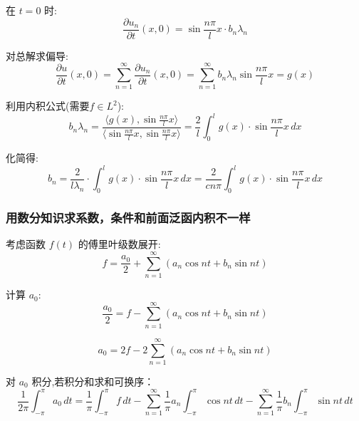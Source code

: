 \documentclass[12pt,a4paper]{article}
\numberwithin{subsection}{section}   %
\numberwithin{subsubsection}{subsection}
\theoremstyle{plain}
\theoremstyle{definition}
\theoremstyle{remark}
\theoremstyle{remark}
\begin{document}
	在 \(t = 0\) 时:
	\begin{equation}
		\frac{\partial u_n}{\partial t}(x, 0) = \sin \frac{n\pi}{l} x \cdot b_n \lambda_n
	\end{equation}
	
	对总解求偏导:
	\begin{equation}
		\frac{\partial u}{\partial t}(x, 0) = \sum_{n=1}^{\infty} \frac{\partial u_n}{\partial t}(x, 0) = \sum_{n=1}^{\infty} b_n \lambda_n \sin \frac{n\pi}{l} x = g(x)
	\end{equation}
	
	利用内积公式(需要$f \in L^2$):
	\begin{equation}
		b_n \lambda_n = \frac{\langle g(x), \sin \frac{n\pi}{l} x \rangle}{\langle \sin \frac{n\pi}{l} x, \sin \frac{n\pi}{l} x \rangle} = \frac{2}{l} \int_0^l g(x) \cdot \sin \frac{n\pi}{l} x \, dx
	\end{equation}
	
	化简得:
	\begin{equation}
		b_n = \frac{2}{l \lambda_n} \cdot \int_0^l g(x) \cdot \sin \frac{n\pi}{l} x \, dx = \frac{2}{c n \pi} \int_0^l g(x) \cdot \sin \frac{n\pi}{l} x \, dx
	\end{equation}
	
	\subsubsection{用数分知识求系数，条件和前面泛函内积不一样}
	
	考虑函数 \( f(t) \) 的傅里叶级数展开:
	\begin{equation}
		f = \frac{a_0}{2} + \sum_{n=1}^{\infty} \left( a_n \cos nt + b_n \sin nt \right)
	\end{equation}
	
	计算 \( a_0 \):
	\begin{equation}
		\frac{a_0}{2} = f - \sum_{n=1}^{\infty} \left( a_n \cos nt + b_n \sin nt \right)
	\end{equation}
	
	\begin{equation}
		a_0 = 2f - 2 \sum_{n=1}^{\infty} \left( a_n \cos nt + b_n \sin nt \right)
	\end{equation}
	
	对 \( a_0 \) 积分,若积分和求和可换序：
	\begin{equation}
		\frac{1}{2\pi} \int_{-\pi}^{\pi} a_0 \, dt = \frac{1}{\pi} \int_{-\pi}^{\pi} f \, dt - \sum_{n=1}^{\infty} \frac{1}{\pi} a_n \int_{-\pi}^{\pi} \cos nt \, dt - \sum_{n=1}^{\infty} \frac{1}{\pi} b_n \int_{-\pi}^{\pi} \sin nt \, dt
	\end{equation}
	
\end{document}

